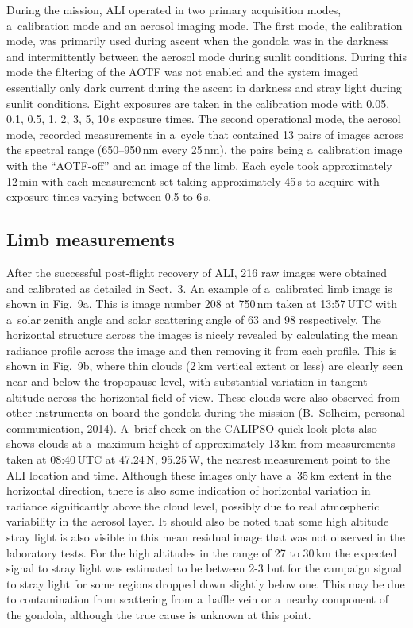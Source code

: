 \documentclass[amtd, online, hvmath]{copernicus}
\begin{document}
During the mission, ALI operated in two primary acquisition modes,
a~calibration mode and an aerosol imaging mode. The first mode, the
calibration mode, was primarily used during ascent when the gondola
was in the darkness and intermittently between the aerosol mode during
sunlit conditions. During this mode the filtering of the AOTF was not
enabled and the system imaged essentially only dark current during the
ascent in darkness and stray light during sunlit conditions. Eight
exposures are taken in the calibration mode with 0.05, 0.1, 0.5, 1, 2,
3, 5, 10\,s exposure times. The second operational mode, the aerosol
mode, recorded measurements in a~cycle that contained 13 pairs of
images across the spectral range (650--950\,\unit{nm} every
25\,\unit{nm}), the pairs being a~calibration image with the
``AOTF-off'' and an image of the limb. Each cycle took approximately
12\,min with each measurement set taking approximately 45\,s to
acquire with exposure times varying between 0.5 to 6\,s.

\subsection{Limb measurements}

After the successful post-flight recovery of ALI, 216 raw images were
obtained and calibrated as detailed in Sect.~3. An example of a~calibrated
limb image is shown in Fig.~9a. This is image number 208 at 750\,\unit{nm}
taken at 13:57\,UTC with a~solar zenith angle and solar scattering angle of
63 and 98{\degree} respectively. The horizontal structure across the images
is nicely revealed by calculating the mean radiance profile across the image
and then removing it from each profile. This is shown in Fig.~9b, where thin
clouds (2\,\unit{km} vertical extent or less) are clearly seen near and below
the tropopause level, with substantial variation in tangent altitude across
the horizontal field of view. These clouds were also observed from other
instruments on board the gondola during the mission (B.~Solheim, personal
communication, 2014). A~brief check on the CALIPSO quick-look plots also
shows clouds at a~maximum height of approximately 13\,\unit{km} from
measurements taken at 08:40\,UTC at 47.24{\degree}\,N, 95.25{\degree}\,W, the
nearest measurement point to the ALI location and time. Although these images
only have a~35\,\unit{km} extent in the horizontal direction, there is also
some indication of horizontal variation in radiance significantly above the
cloud level, possibly due to real atmospheric variability in the aerosol
layer. It should also be noted that some high altitude stray light is also
visible in this mean residual image that was not observed in the laboratory
tests. For the high altitudes in the range of 27 to 30\,\unit{km} the expected signal to stray light was estimated to be between 2-3 but for the campaign signal to stray light for some regions dropped down slightly below one. This may be due to contamination from scattering from a~baffle vein or
a~nearby component of the gondola, although the true cause is unknown at this
point.
\end{document}
